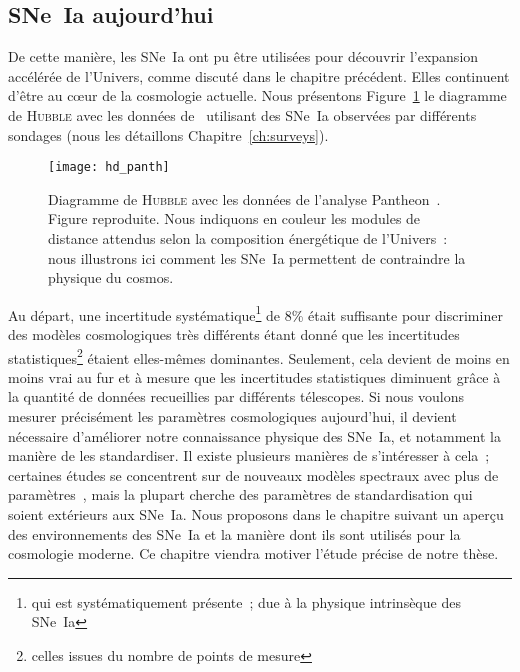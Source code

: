 \documentclass[../main/main.tex]{subfiles}
\begin{document}
\subsection{SNe~Ia aujourd'hui}\label{ssec:snetoday}

De cette manière, les SNe~Ia ont pu être utilisées pour découvrir l'expansion
accélérée de l'Univers, comme discuté dans le chapitre précédent. Elles
continuent d'être au cœur de la cosmologie actuelle. Nous présentons
Figure~\ref{fig:hubdiag} le diagramme de \textsc{Hubble} avec les données
de~\cite{scolnic2018} utilisant des SNe~Ia observées par différents sondages
(nous les détaillons Chapitre~\ref{ch:surveys}).

\begin{figure}[]
    \centering
    \texttt{[image: hd\_panth]}
    \caption[Diagramme de \textsc{Hubble} avec les données de l'analyse
    Pantheon]{Diagramme de \textsc{Hubble} avec les données de l'analyse
        Pantheon~\citep{scolnic2018}. Figure reproduite. Nous indiquons en
        couleur les modules de distance attendus selon la composition
        énergétique de l'Univers~: nous illustrons ici comment les SNe~Ia
    permettent de contraindre la physique du cosmos.}\label{fig:hubdiag}
\end{figure}

Au départ, une incertitude systématique\footnote{qui est systématiquement
présente~; due à la physique intrinsèque des SNe~Ia} de 8\% était suffisante
pour discriminer des modèles cosmologiques très différents étant donné que les
incertitudes statistiques\footnote{celles issues du nombre de points de mesure}
étaient elles-mêmes dominantes. Seulement, cela devient de moins en moins vrai
au fur et à mesure que les incertitudes statistiques diminuent grâce à la
quantité de données recueillies par différents télescopes. Si nous voulons
mesurer précisément les paramètres cosmologiques aujourd'hui, il devient
nécessaire d'améliorer notre connaissance physique des SNe~Ia, et notamment la
manière de les standardiser. Il existe plusieurs manières de s'intéresser à
cela~; certaines études se concentrent sur de nouveaux modèles spectraux avec
plus de paramètres~\cite[par exemple][]{leget2020}, mais la plupart cherche des
paramètres de standardisation qui soient extérieurs aux SNe~Ia. Nous proposons
dans le chapitre suivant un aperçu des environnements des SNe~Ia et la manière
dont ils sont utilisés pour la cosmologie moderne. Ce chapitre viendra motiver
l'étude précise de notre thèse.

\newpage

\thispagestyle{plain}
\vfill
\minilof
\vfill
\minilot
\vfill

% 
% 
\end{document}

